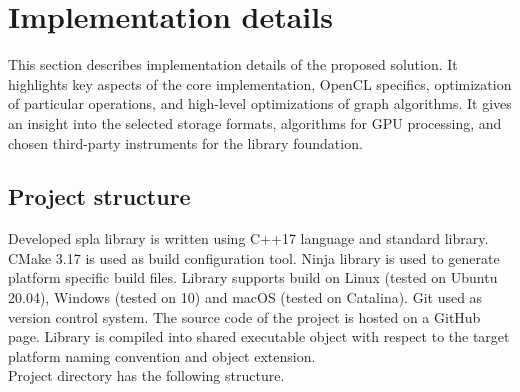 \section{Implementation details}

This section describes implementation details of the proposed solution. 
It highlights key aspects of the core implementation, OpenCL specifics, optimization of particular operations, and high-level optimizations of graph algorithms. It gives an insight into the selected storage formats, algorithms for GPU processing, and chosen third-party instruments for the library foundation.

\subsection{Project structure}

Developed spla library is written using C++17 language and standard library. CMake 3.17 is used as build configuration tool. Ninja library is used to generate platform specific build files. Library supports build on Linux (tested on Ubuntu 20.04), Windows (tested on 10) and macOS (tested on Catalina). Git used as version control system. The source code of the project is hosted on a GitHub page. Library is compiled into shared executable object with respect to the target platform naming convention and object extension.\\

Project directory has the following structure.\\

